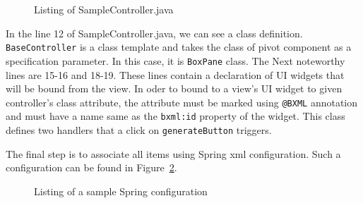 \begin{figure}[ht]
\centering
 
\caption{Listing of SampleController.java}
\label{fig:sample_controller}
\end{figure} 

In the line 12 of SampleController.java, we can see a class definition. \texttt{BaseController} is a class template and takes the class of pivot component as a specification parameter. In this case, it is \texttt{BoxPane} class. The Next noteworthy lines are 15-16 and 18-19. These lines contain a declaration of UI widgets that will be bound from the view. In oder to bound to a view\rq{}s UI widget to given controller\rq{}s class attribute, the attribute must be marked using \texttt{@BXML} annotation and must have a name same as the \texttt{bxml:id} property of the widget. This class defines two handlers that a click on \texttt{generateButton} triggers.

The final step is to associate all items using Spring xml configuration. Such a configuration can be found in Figure~\ref{fig:sample_spring}.

\begin{figure}[ht]
\centering
 
\caption{Listing of a sample Spring configuration}
\label{fig:sample_spring}
\end{figure}

